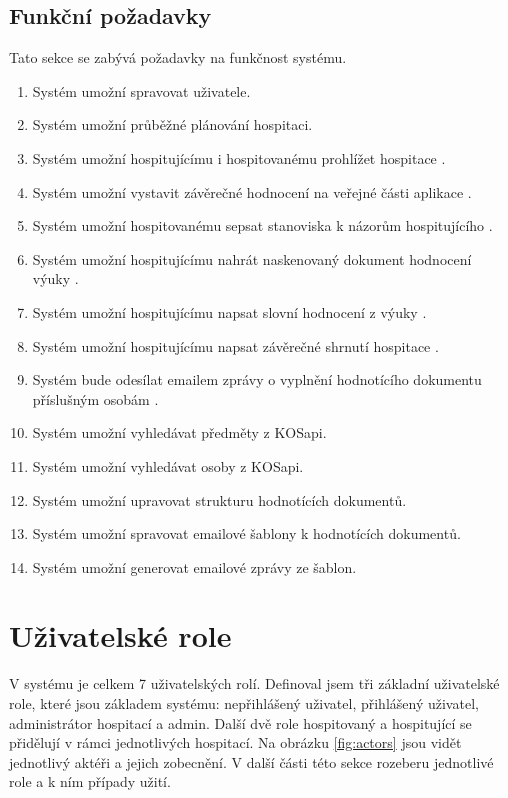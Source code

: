 \subsection{Funkční požadavky}
Tato sekce se zabývá požadavky na funkčnost systému.
\begin{enumerate}
\item Systém umožní spravovat uživatele.
\item Systém umožní průběžné plánování hospitaci.
\item Systém umožní hospitujícímu i hospitovanému prohlížet hospitace \cite{prototyp_documentace}.
\item Systém umožní vystavit závěrečné hodnocení na veřejné části aplikace \cite{prototyp_documentace}. 
\item Systém umožní hospitovanému sepsat stanoviska k názorům hospitujícího \cite{prototyp_documentace}.
\item Systém umožní hospitujícímu nahrát naskenovaný dokument hodnocení výuky \cite{prototyp_documentace}.
\item Systém umožní hospitujícímu napsat slovní hodnocení z výuky \cite{prototyp_documentace}.
\item Systém umožní hospitujícímu napsat závěrečné shrnutí hospitace \cite{prototyp_documentace}.
\item Systém bude odesílat emailem zprávy o vyplnění hodnotícího dokumentu příslušným osobám \cite{prototyp_documentace}.
\item Systém umožní vyhledávat předměty z KOSapi.
\item Systém umožní vyhledávat osoby z KOSapi.
\item Systém umožní upravovat strukturu hodnotících dokumentů.
\item Systém umožní spravovat emailové šablony k hodnotících dokumentů.
\item Systém umožní generovat emailové zprávy ze šablon.
\end{enumerate}

\newpage 
\section{Uživatelské role}
V systému je celkem 7 uživatelských rolí. Definoval jsem tři základní uživatelské role, které jsou základem systému: nepřihlášený uživatel, přihlášený uživatel, administrátor hospitací a admin. Další dvě role hospitovaný a hospitující se přidělují v rámci jednotlivých hospitací. Na obrázku \ref{fig:actors} jsou vidět jednotlivý aktéři a jejich zobecnění. V další části této sekce rozeberu jednotlivé role a k ním případy užití.

